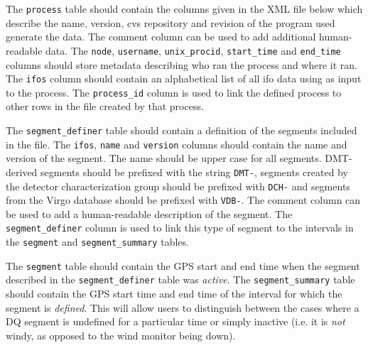 The \verb|process| table should contain the columns given in the XML
file below which describe the name, version, cvs repository and
revision of the program used generate the data. The comment column can
be used to add additional human-readable data. The \verb|node|,
\verb|username|,
\verb|unix_procid|, \verb|start_time| and \verb|end_time| columns should store metadata
describing who ran the process and where it ran. The \verb|ifos| column
should contain an alphabetical list of all ifo data using as input to
the process. The \verb|process_id| column is used to link the defined
process to other rows in the file created by that process.

The \verb|segment_definer| table should contain a definition of the
segments included in the file. The \verb|ifos|, \verb|name| and
\verb|version| columns should contain the name and version of the
segment. The name should be upper case for all segments. DMT-derived
segments should be prefixed with the string \verb|DMT-|, segments
created by the detector characterization group should be prefixed with
\verb|DCH-| and segments from the Virgo database should be prefixed
with \verb|VDB-|.  The comment column can be used to add a
human-readable description of the segment. The \verb|segment_definer|
column is used to link this type of segment to the intervals in the
\verb|segment| and \verb|segment_summary| tables.

The \verb|segment| table should contain the GPS start and end time
when the segment described in the \verb|segment_definer| table was
\emph{active}. The \verb|segment_summary| table should contain the GPS
start time and end time of the interval for which the segment is
\emph{defined}. This will allow users to distinguish between the cases
where a DQ segment is undefined for a particular time or simply
inactive (i.e. it is \emph{not} windy, as opposed to the wind monitor
being down).

